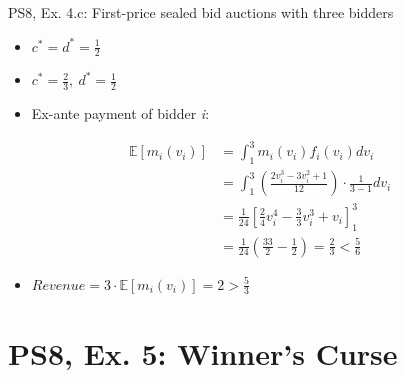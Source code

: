 \begin{frame}{PS8, Ex. 4.c: First-price sealed bid auctions with three bidders}
\begin{multicols}{2}
\begin{itemize}
        \item[(3.a)] $c^*=d^*=\frac{1}{2}$
        \item[(4.a)] $c^*=\frac{2}{3},\ d^*=\frac{1}{2}$
        \item[\nth{2}:] Ex-ante payment of bidder \textit{i}:
      \end{itemize}
      \vspace{-12pt}
      \begin{align*}
        \mathbb{E}[m_i(v_i)]&=\textstyle\int_1^3m_i(v_i)f_i(v_i)dv_i\\
                            &=\textstyle\int_1^3\left(\frac{2v_i^3-3v_i^2+1}{12}\right)\cdot\frac{1}{3-1}dv_i\\
                            &=\frac{1}{24}\left[\frac{2}{4}v_i^4-\frac{3}{3}v_i^3+v_i\right]_1^3\\
                            &=\frac{1}{24}\left(\frac{33}{2}-\frac{1}{2}\right)=\frac{2}{3}<\frac{5}{6}
      \end{align*}
      \vspace{-16pt}
      \begin{itemize}
        \item[\nth{3}:] $Revenue=3\cdot\mathbb{E}[m_i(v_i)]=2>\frac{5}{3}$
      \end{itemize}
      \vspace{-6pt}
      \vfill\null
    \end{multicols}
    \vfill\null
\end{frame}



\section{PS8, Ex. 5: Winner's Curse}

